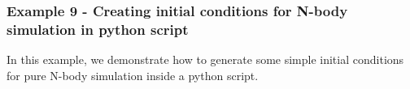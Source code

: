 \documentclass[a4paper]{article}
\newcommand{\var}[1]{\texttt{#1}}
\begin{document}
\subsubsection{Example  9 - Creating initial conditions for N-body simulation in python script}
In this example, we demonstrate how to generate some simple initial conditions for pure N-body simulation inside a python script. \\

\end{document}
